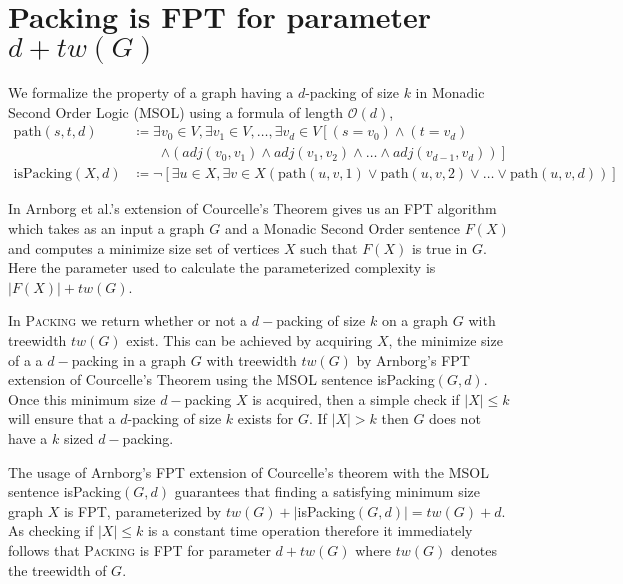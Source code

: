 \documentclass[12pt, a4paper]{article}
\theoremstyle{definition}
\newcommand{\mcO}{\mathcal{O}}
\begin{document}
\section{\sc Packing \textnormal{is FPT for parameter $d + tw(G)$}}

We formalize the property of a graph having a $d$-packing of size $k$ in Monadic Second Order Logic (MSOL) using a formula of length $\mcO(d)$,
\begin{align*}
	\mathrm{path}(s, t, d) 		&\coloneqq \exists v_0 \in V, \exists v_1 \in V, \dotsc, \exists v_d \in V
									\left [ (s=v_0) \wedge (t=v_d) \right.\nonumber \\
								&\qquad \left. \wedge (adj(v_0, v_1) \wedge adj(v_1, v_2) 
									\wedge \dots \wedge adj(v_{d-1}, v_d)) \right ] \\
	\mathrm{isPacking}(X, d)	&\coloneqq \neg \left [\exists u \in X, \exists v \in X (\mathrm{path}(u, v, 1) 
									\vee \mathrm{path}(u, v, 2) \vee \dots \vee \mathrm{path}(u, v, d) ) \right ]
\end{align*}

In Arnborg et al.'s \cite{Arnborg1991} extension of Courcelle's Theorem gives us an FPT algorithm which takes as an input a graph $G$ and a Monadic Second Order sentence $F(X)$ and computes a minimize size set of vertices $X$ such that $F(X)$ is true in $G$. Here the parameter used to calculate the parameterized complexity is $|F(X)| + tw(G)$. 

In \textsc{Packing} we return whether or not a $d-$packing of size $k$ on a graph $G$ with treewidth $tw(G)$ exist. This can be achieved by acquiring $X$, the minimize size of a a $d-$packing in a graph $G$ with treewidth $tw(G)$ by Arnborg's FPT extension of Courcelle's Theorem using the MSOL sentence isPacking$(G,d)$. Once this minimum size $d-$packing $X$ is acquired, then a simple check if $|X| \leq k$ will ensure that a $d$-packing of size $k$ exists for $G$. If $|X| > k$ then $G$ does not have a $k$ sized $d-$packing.



The usage of Arnborg's FPT extension of Courcelle's theorem with the MSOL sentence isPacking$(G,d)$ guarantees that finding a satisfying minimum size graph $X$ is FPT, parameterized by $tw(G) + |$isPacking$(G,d)| = tw(G) + d$. As checking if $|X| \leq k$ is a constant time operation therefore it immediately follows that \textsc{Packing} is FPT for parameter $d+tw(G)$ where $tw(G)$ denotes the treewidth of $G$.




\end{document}
